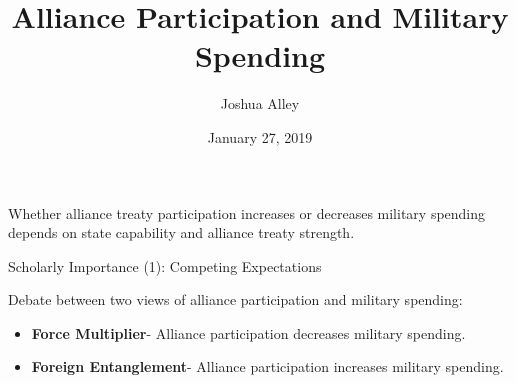 \documentclass{beamer}
\title{Alliance Participation and Military Spending}
\date{January 27, 2019}
\author{Joshua Alley}
\institute{Texas A\&M University}
\begin{document}
 \maketitle




 \begin{frame}[standout]

Whether alliance treaty participation increases or decreases military spending depends on state capability and alliance treaty strength. 

 \end{frame}

 \begin{frame}[standout]




 \end{frame}




\begin{frame}{Scholarly Importance (1): Competing Expectations}

Debate between two views of alliance participation and military spending:
\pause 

\begin{itemize}
\item \textbf{Force Multiplier}- Alliance participation decreases military spending.
\pause 
\item \textbf{Foreign Entanglement}- Alliance participation increases military spending.
\end{itemize} 


 \end{frame}

\end{document}
